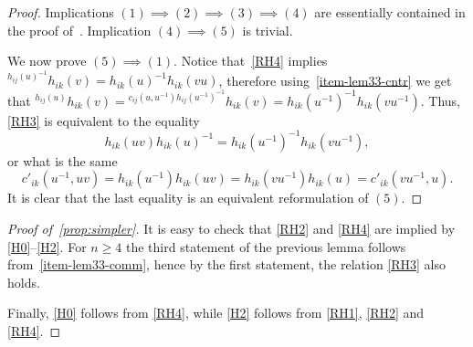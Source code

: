 \documentclass[oneside, 12pt]{amsart}
\theoremstyle{plain}
\numberwithin{equation}{section}
\numberwithin{lemma}{section}
\theoremstyle{remark}
\theoremstyle{definition}
\begin{document}
\begin{proof}
Implications $(1) \implies (2) \implies (3) \implies (4)$ are essentially contained in the proof of~\cite[Lemmas~2.1-2.2]{Reh78}.
Implication $(4) \implies (5)$ is trivial.

We now prove $(5) \implies (1)$. Notice that~\eqref{RH4} implies ${}^{h_{ij}(u)^{-1}}h_{ik}(v) = h_{ik}(u)^{-1} h_{ik}(vu)$, therefore
using~\cref{item-lem33-cntr} we get that ${}^{h_{ij}(u)}h_{ik}(v) = {}^{c_{ij}(u, u^{-1}) h_{ij}(u^{-1})^{-1}}h_{ik}(v) = h_{ik}(u^{-1})^{-1} h_{ik}(vu^{-1}).$
Thus, \eqref{RH3} is equivalent to the equality 
\[ h_{ik}(uv) h_{ik}(u)^{-1} = h_{ik}(u^{-1})^{-1} h_{ik}(vu^{-1}),\]
or what is the same
\[c'_{ik}(u^{-1}, uv) = h_{ik}(u^{-1}) h_{ik}(uv) =  h_{ik}(vu^{-1}) h_{ik}(u) = c'_{ik}(vu^{-1}, u).\]
It is clear that the last equality is an equivalent reformulation of $(5)$.
\end{proof}

\begin{proof}[Proof of~\cref{prop:simpler}]
It is easy to check that \eqref{RH2} and \eqref{RH4} are implied by \eqref{H0}--\eqref{H2}. 
For $n\geq 4$ the third statement of the previous lemma follows from~\cref{item-lem33-comm}, 
 hence by the first statement, the relation \eqref{RH3} also holds.

Finally, \eqref{H0} follows from \eqref{RH4}, while \eqref{H2} follows from \eqref{RH1}, \eqref{RH2} and \eqref{RH4}.
\end{proof}
\end{document}
